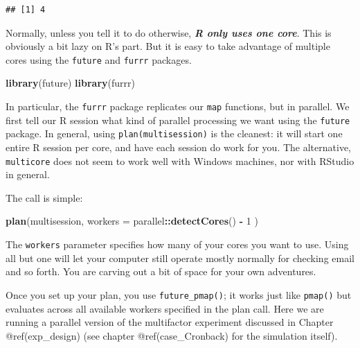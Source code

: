 \documentclass[
]{book}
\newenvironment{Shaded}{\begin{snugshade}}{\end{snugshade}}
\newcommand{\AttributeTok}[1]{\textcolor[rgb]{0.13,0.29,0.53}{#1}}
\newcommand{\ConstantTok}[1]{\textcolor[rgb]{0.56,0.35,0.01}{#1}}
\newcommand{\DecValTok}[1]{\textcolor[rgb]{0.00,0.00,0.81}{#1}}
\newcommand{\FunctionTok}[1]{\textcolor[rgb]{0.13,0.29,0.53}{\textbf{#1}}}
\newcommand{\NormalTok}[1]{#1}
\newcommand{\OtherTok}[1]{\textcolor[rgb]{0.56,0.35,0.01}{#1}}
\newcommand{\SpecialCharTok}[1]{\textcolor[rgb]{0.81,0.36,0.00}{\textbf{#1}}}
\begin{document}
\begin{verbatim}
## [1] 4
\end{verbatim}

Normally, unless you tell it to do otherwise, \textbf{\emph{R only uses one core}}.
This is obviously a bit lazy on R's part.
But it is easy to take advantage of multiple cores using the \texttt{future} and \texttt{furrr} packages.

\begin{Shaded}
\begin{Highlighting}[]
\FunctionTok{library}\NormalTok{(future)}
\FunctionTok{library}\NormalTok{(furrr)}
\end{Highlighting}
\end{Shaded}

In particular, the \texttt{furrr} package replicates our \texttt{map} functions, but in parallel.
We first tell our R session what kind of parallel processing we want using the \texttt{future} package.
In general, using \texttt{plan(multisession)} is the cleanest: it will start one entire R session per core, and have each session do work for you.
The alternative, \texttt{multicore} does not seem to work well with Windows machines, nor with RStudio in general.

The call is simple:

\begin{Shaded}
\begin{Highlighting}[]
\FunctionTok{plan}\NormalTok{(multisession, }\AttributeTok{workers =}\NormalTok{ parallel}\SpecialCharTok{::}\FunctionTok{detectCores}\NormalTok{() }\SpecialCharTok{{-}} \DecValTok{1}\NormalTok{ )}
\end{Highlighting}
\end{Shaded}

The \texttt{workers} parameter specifies how many of your cores you want to use.
Using all but one will let your computer still operate mostly normally for checking email and so forth.
You are carving out a bit of space for your own adventures.

Once you set up your plan, you use \texttt{future\_pmap()}; it works just like \texttt{pmap()} but evaluates across all available workers specified in the plan call.
Here we are running a parallel version of the multifactor experiment discussed in Chapter @ref(exp\_design) (see chapter @ref(case\_Cronback) for the simulation itself).

\begin{Shaded}
\end{Shaded}
\end{document}
